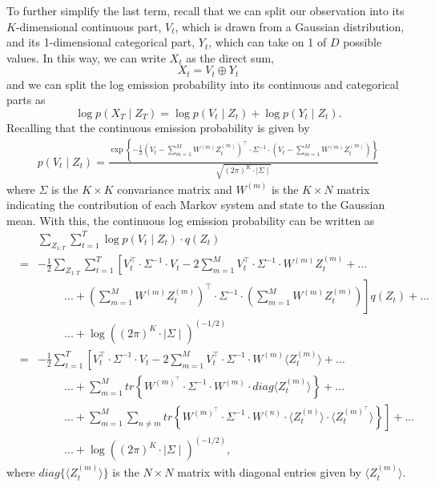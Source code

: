 \documentclass{amsart}
\begin{document}
To further simplify the last term, recall that we can split our 
observation into its $K$-dimensional continuous part, $V_t$, which is 
drawn from a Gaussian distribution, and its 
1-dimensional categorical part, $Y_t$, which can take on 1 of $D$ 
possible values. In this way, we can write $X_t$ as the direct sum, 
\[
X_t = V_t\oplus Y_t
\]
and we can split the log emission probability into its continuous and 
categorical parts as 
\[
\log p(X_T\mid Z_T) = \log p(V_t\mid Z_t) + \log p(Y_t\mid Z_t).
\]
Recalling that the continuous emission probability is given by 
\begin{eqnarray*}
p(V_t\mid Z_t) = \frac{\exp\left\{-\frac{1}{2}\left(V_t - 
\sum_{m=1}^MW^{(m)}Z_t^{(m)}\right)^\intercal\cdot \Sigma^{-1}\cdot \left(V_t - 
\sum_{m=1}^MW^{(m)}Z_t^{(m)}\right)\right\}}{\sqrt{(2\pi)^{K}\cdot 
\mid \Sigma\mid}}
\end{eqnarray*}
where $\Sigma$ is the $K\times K$ convariance matrix and $W^{(m)}$ is 
the $K\times N$ matrix indicating the contribution of each Markov 
system and state to the Gaussian mean. 
With this, the continuous log emission probability can be written as 
\begin{eqnarray*}
&&\sum_{Z_{1:T}}\sum_{t=1}^T\log p(V_t\mid Z_t)\cdot q(Z_t) \\
& = & 
-\frac{1}{2}\sum_{Z_{1:T}}\sum_{t=1}^T\left[V_t^\intercal\cdot \Sigma^{-1}\cdot 
V_t - 2\sum_{m=1}^M V_t^\intercal \cdot \Sigma^{-1}\cdot 
W^{(m)}Z_t^{(m)} \right.+...\\
&&\hspace{1cm}...+\left.\left(\sum_{m=1}^MW^{(m)}Z_t^{(m)}\right)^\intercal\cdot 
\Sigma^{-1}\cdot 
\left(\sum_{m=1}^MW^{(m)}Z_t^{(m)}\right)
\right]q(Z_t)+...\\
&&\hspace{1cm}...+ \log \left((2\pi)^K\cdot\mid 
\Sigma\mid\right)^{(-1/2)}\\
& = & 
-\frac{1}{2}\sum_{t=1}^T\left[V_t^\intercal\cdot \Sigma^{-1}\cdot 
V_t - 2\sum_{m=1}^M V_t^\intercal \cdot \Sigma^{-1}\cdot 
W^{(m)}\langle Z_t^{(m)} \rangle\right.+...\\
&&\hspace{1cm}...+\left.\sum_{m=1}^M tr\left\{W^{(m)^\intercal}\cdot \Sigma^{-1}\cdot 
W^{(m)}\cdot diag\langle Z_t^{(m)}\rangle\right\}\right.+...\\
&&\hspace{1cm}...+\left.\sum_{m=1}^M\sum_{n\neq m} 
tr\left\{W^{(m)^\intercal}\cdot \Sigma^{-1}\cdot W^{(n)}\cdot \langle 
Z_t^{(n)}\rangle\cdot \langle 
Z_t^{(m)^\intercal}\rangle\right\}\right]+...\\
&&\hspace{1cm}...+ \log \left((2\pi)^K\cdot\mid 
\Sigma\mid\right)^{(-1/2)},
\end{eqnarray*}
where $diag\{\langle Z_t^{(m)}\rangle\}$ is the $N\times N$ matrix with diagonal entries 
given by $\langle Z_t^{(m)}\rangle$.
\end{document}
